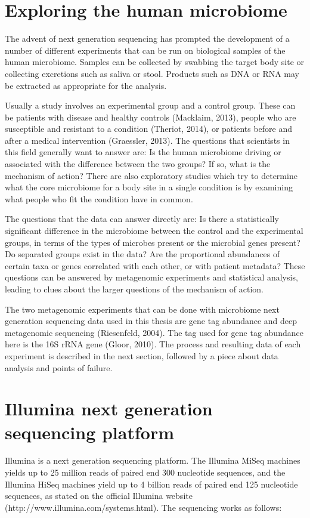 \section{Exploring the human microbiome}
The advent of next generation sequencing has prompted the development of a number of different experiments that can be run on biological samples of the human microbiome. Samples can be collected by swabbing the target body site or collecting excretions such as saliva or stool. Products such as DNA or RNA may be extracted as appropriate for the analysis.

Usually a study involves an experimental group and a control group. These can be patients with disease and healthy controls (Macklaim, 2013), people who are susceptible and resistant to a condition (Theriot, 2014), or patients before and after a medical intervention (Graessler, 2013). The questions that scientists in this field generally want to answer are: Is the human microbiome driving or associated with the difference between the two groups? If so, what is the mechanism of action? There are also exploratory studies which try to determine what the core microbiome for a body site in a single condition is by examining what people who fit the condition have in common.

The questions that the data can answer directly are: Is there a statistically significant difference in the microbiome between the control and the experimental groups, in terms of the types of microbes present or the microbial genes present? Do separated groups exist in the data? Are the proportional abundances of certain taxa or genes correlated with each other, or with patient metadata? These questions can be answered by metagenomic experiments and statistical analysis, leading to clues about the larger questions of the mechanism of action.

The two metagenomic experiments that can be done with microbiome next generation sequencing data used in this thesis are gene tag abundance and deep metagenomic sequencing (Riesenfeld, 2004). The tag used for gene tag abundance here is the 16S rRNA gene (Gloor, 2010). The process and resulting data of each experiment is described in the next section, followed by a piece about data analysis and points of failure.

\section{Illumina next generation sequencing platform}
Illumina is a next generation sequencing platform. The Illumina MiSeq machines yields up to 25 million reads of paired end 300 nucleotide sequences, and the Illumina HiSeq machines yield up to 4 billion reads of paired end 125 nucleotide sequences, as stated on the official Illumina website (http://www.illumina.com/systems.html). The sequencing works as follows:

